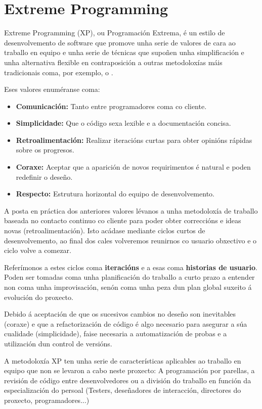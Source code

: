 \section{Extreme Programming}

Extreme Programming (XP), ou Programación Extrema, é un estilo de desenvolvemento de software que promove unha serie de valores de cara ao traballo en equipo e unha serie de técnicas que supoñen unha simplificación e unha alternativa flexible en contraposición a outras metodoloxías máis tradicionais coma, por exemplo, o .

Eses valores enuméranse coma\cite{xp}: 

\begin{itemize}
	\item \textbf{Comunicación:} Tanto entre programadores coma co cliente.
	\item \textbf{Simplicidade:} Que o código sexa lexible e a documentación concisa.
	\item \textbf{Retroalimentación:} Realizar iteracións curtas para obter opinións rápidas sobre os progresos.
	\item \textbf{Coraxe:} Aceptar que a aparición de novos requirimentos é natural e poden redefinir o deseño.
	\item \textbf{Respecto:} Estrutura horizontal do equipo de desenvolvemento.
\end{itemize}


A posta en práctica dos anteriores valores lévanos a unha metodoloxía de traballo baseada no contacto continuo co cliente para poder obter correccións e ideas novas (retroalimentación). Isto acádase mediante ciclos curtos de desenvolvemento, ao final dos cales volveremos reunirnos co usuario obxectivo e o ciclo volve a comezar. 

Referímonos a estes ciclos coma \textbf{iteracións} e a esas  coma \textbf{historias de usuario}. Poden ser tomadas coma unha planificación do traballo a curto prazo a entender non coma unha improvisación, senón coma unha peza dun plan global suxeito á evolución do proxecto.

Debido á aceptación de que os sucesivos cambios no deseño son inevitables (coraxe) e que a refactorización de código é algo necesario para asegurar a súa cualidade (simplicidade), faise necesaria a automatización de probas e a utilización dun control de versións.

A metodoloxía XP ten unha serie de características aplicables ao traballo en equipo que non se levaron a cabo neste proxecto: A programación por parellas, a revisión de código entre desenvolvedores ou a división do traballo en función da especialización do persoal (Testers, deseñadores de interacción, directores do proxecto, programadores...)

